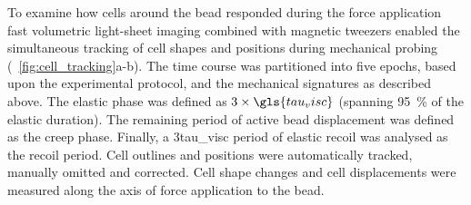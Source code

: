 To examine how cells around the bead responded during the force application fast volumetric light-sheet imaging combined with magnetic tweezers enabled the simultaneous tracking of cell shapes and positions during mechanical probing (\figurename~\ref{fig:cell_tracking}a-b).
The time course was partitioned into five epochs, based upon the experimental protocol, and the mechanical signatures as described above.
The elastic phase was defined as \(3\times\gls{tau_visc}\) (spanning \SI{95}{\percent} of the elastic duration).
The remaining period of active bead displacement was defined as the creep phase.
Finally, a 3\gls{tau_visc} period of elastic recoil was analysed as the recoil period.
Cell outlines and positions were automatically tracked, manually omitted and corrected.
Cell shape changes and cell displacements were measured along the axis of force application to the bead.


